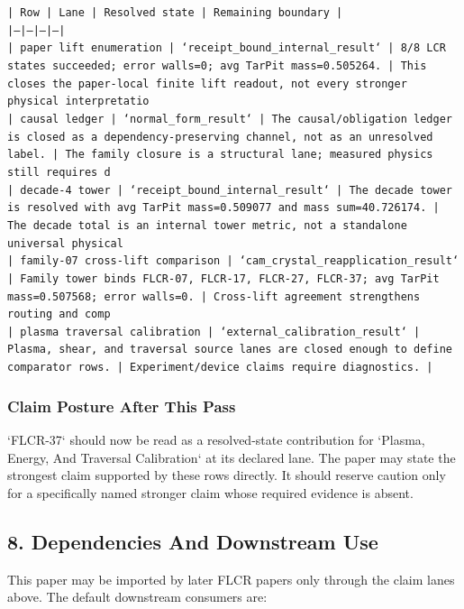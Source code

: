 \documentclass[11pt]{article}
\begin{document}
\noindent\texttt{| Row | Lane | Resolved state | Remaining boundary |}\\
\noindent\texttt{|---|---|---|---|}\\
\noindent\texttt{| paper lift enumeration | `receipt\_bound\_internal\_result` | 8/8 LCR states succeeded; error walls=0; avg TarPit mass=0.505264. | This closes the paper-local finite lift readout, not every stronger physical interpretatio}\\
\noindent\texttt{| causal ledger | `normal\_form\_result` | The causal/obligation ledger is closed as a dependency-preserving channel, not as an unresolved label. | The family closure is a structural lane; measured physics still requires d}\\
\noindent\texttt{| decade-4 tower | `receipt\_bound\_internal\_result` | The decade tower is resolved with avg TarPit mass=0.509077 and mass sum=40.726174. | The decade total is an internal tower metric, not a standalone universal physical }\\
\noindent\texttt{| family-07 cross-lift comparison | `cam\_crystal\_reapplication\_result` | Family tower binds FLCR-07, FLCR-17, FLCR-27, FLCR-37; avg TarPit mass=0.507568; error walls=0. | Cross-lift agreement strengthens routing and comp}\\
\noindent\texttt{| plasma traversal calibration | `external\_calibration\_result` | Plasma, shear, and traversal source lanes are closed enough to define comparator rows. | Experiment/device claims require diagnostics. |}\\

\subsubsection*{Claim Posture After This Pass}

`FLCR-37` should now be read as a resolved-state contribution for `Plasma, Energy, And Traversal Calibration` at its declared lane. The paper may state the strongest claim supported by these rows directly. It should reserve caution only for a specifically named stronger claim whose required evidence is absent.

\subsection*{8. Dependencies And Downstream Use}

This paper may be imported by later FLCR papers only through the claim lanes
above. The default downstream consumers are:
\end{document}
